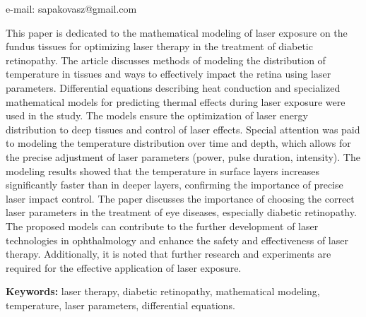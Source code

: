 e-mail: sapakovasz@gmail.com

This paper is dedicated to the mathematical modeling of laser exposure
on the fundus tissues for optimizing laser therapy in the treatment of
diabetic retinopathy. The article discusses methods of modeling the
distribution of temperature in tissues and ways to effectively impact
the retina using laser parameters. Differential equations describing
heat conduction and specialized mathematical models for predicting
thermal effects during laser exposure were used in the study. The models
ensure the optimization of laser energy distribution to deep tissues and
control of laser effects. Special attention was paid to modeling the
temperature distribution over time and depth, which allows for the
precise adjustment of laser parameters (power, pulse duration,
intensity). The modeling results showed that the temperature in surface
layers increases significantly faster than in deeper layers, confirming
the importance of precise laser impact control. The paper discusses the
importance of choosing the correct laser parameters in the treatment of
eye diseases, especially diabetic retinopathy. The proposed models can
contribute to the further development of laser technologies in
ophthalmology and enhance the safety and effectiveness of laser therapy.
Additionally, it is noted that further research and experiments are
required for the effective application of laser exposure.

{\bfseries Keywords:} laser therapy, diabetic retinopathy, mathematical
modeling, temperature, laser parameters, differential equations.

